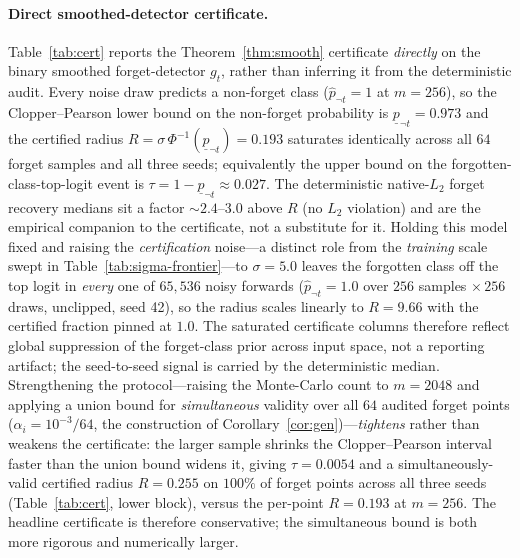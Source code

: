 \documentclass[11pt]{article}
\begin{document}
\paragraph{Direct smoothed-detector certificate.} Table~\ref{tab:cert} reports the Theorem~\ref{thm:smooth} certificate \emph{directly} on the binary smoothed forget-detector $g_t$, rather than inferring it from the deterministic audit. Every noise draw predicts a non-forget class ($\hat p_{\neg t} = 1$ at $m = 256$), so the Clopper--Pearson lower bound on the non-forget probability is $\underline p_{\neg t} = 0.973$ and the certified radius $R = \sigma\,\Phi^{-1}(\underline p_{\neg t}) = 0.193$ saturates identically across all $64$ forget samples and all three seeds; equivalently the upper bound on the forgotten-class-top-logit event is $\tau = 1 - \underline p_{\neg t} \approx 0.027$. The deterministic native-$L_2$ forget recovery medians sit a factor $\sim\!2.4$--$3.0$ above $R$ (no $L_2$ violation) and are the empirical companion to the certificate, not a substitute for it. Holding this model fixed and raising the \emph{certification} noise---a distinct role from the \emph{training} scale swept in Table~\ref{tab:sigma-frontier}---to $\sigma = 5.0$ leaves the forgotten class off the top logit in \emph{every} one of $65{,}536$ noisy forwards ($\hat p_{\neg t} = 1.0$ over $256$ samples $\times\,256$ draws, unclipped, seed 42), so the radius scales linearly to $R = 9.66$ with the certified fraction pinned at $1.0$. The saturated certificate columns therefore reflect global suppression of the forget-class prior across input space, not a reporting artifact; the seed-to-seed signal is carried by the deterministic median. Strengthening the protocol---raising the Monte-Carlo count to $m=2048$ and applying a union bound for \emph{simultaneous} validity over all $64$ audited forget points ($\alpha_i = 10^{-3}/64$, the construction of Corollary~\ref{cor:gen})---\emph{tightens} rather than weakens the certificate: the larger sample shrinks the Clopper--Pearson interval faster than the union bound widens it, giving $\tau = 0.0054$ and a simultaneously-valid certified radius $R = 0.255$ on $100\%$ of forget points across all three seeds (Table~\ref{tab:cert}, lower block), versus the per-point $R = 0.193$ at $m=256$. The headline certificate is therefore conservative; the simultaneous bound is both more rigorous and numerically larger.
\end{document}
